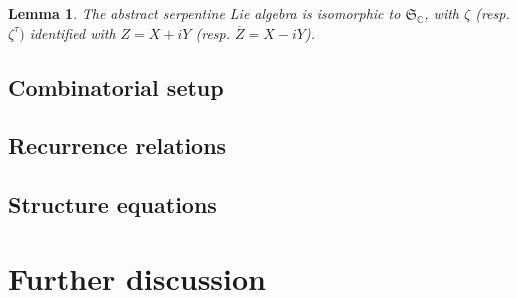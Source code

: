 \documentclass{article}
\def\fS{\mathfrak{S}}
\def\CC{\mathbb{C}}
\newtheorem{lem}{Lemma}
\theoremstyle{definition}
\begin{document}
\begin{lem}
        The abstract serpentine Lie algebra is isomorphic
        to $\fS_\CC$, with $\zeta$ (resp. $\zeta^\tau)$ identified with $Z = X+iY$
        (resp. $\overline Z=X-iY$).
\end{lem}

\subsection{Combinatorial setup}

\subsection{Recurrence relations}

\subsection{Structure equations}

\section{Further discussion}
\label{sec:further}
\end{document}
